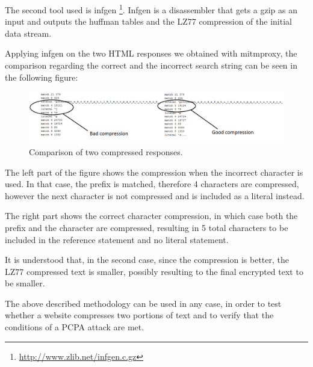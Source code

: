 The second tool used is infgen \footnote{\url{http://www.zlib.net/infgen.c.gz}}.
Infgen is a disassembler that gets a gzip as an input and outputs the huffman
tables and the LZ77 compression of the initial data stream.

Applying infgen on the two HTML responses we obtained with mitmproxy, the
comparison regarding the correct and the incorrect search string can be seen in
the following figure:

\begin{figure}[H] \caption{Comparison of two compressed responses.}
\includegraphics[width=1.15\textwidth]{diagrams/compression_comparison.png}\end{figure}

The left part of the figure shows the compression when the incorrect character
is used. In that case, the prefix is matched, therefore 4 characters are
compressed, however the next character is not compressed and is included as a
literal instead.

The right part shows the correct character compression, in
which case both the prefix and the character are compressed, resulting in 5
total characters to be included in the reference statement and no literal
statement.

It is understood that, in the second case, since the compression is better, the
LZ77 compressed text is smaller, possibly resulting to the final encrypted text
to be smaller.

The above described methodology can be used in any case, in order to test
whether a website compresses two portions of text and to verify that the
conditions of a PCPA attack are met.
